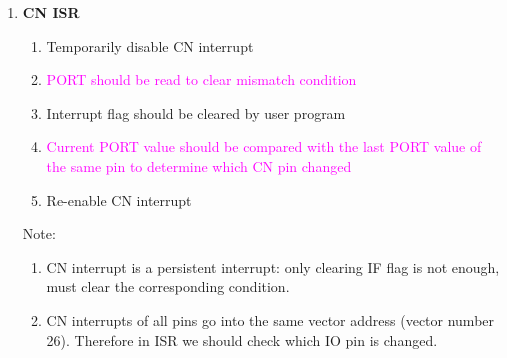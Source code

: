 \documentclass[a4paper]{article}
\begin{document}
\begin{enumerate}[label = \arabic*.]
    \item \textbf{CN ISR}
      \begin{enumerate}[label = \arabic*.]
        \item Temporarily disable CN interrupt
        \item \textcolor{magenta}{PORT should be read to clear mismatch condition}
        \item Interrupt flag should be cleared by user program
        \item \textcolor{magenta}{Current PORT value should be compared with the last PORT value of the same pin to determine which CN pin changed}
        \item Re-enable CN interrupt
      \end{enumerate}

      \par Note:
      \begin{enumerate}[label = \arabic*.]
        \item CN interrupt is a persistent interrupt: only clearing IF flag is not enough, must clear the corresponding condition.
        \item CN interrupts of all pins go into the same vector address (vector number 26). Therefore in ISR we should check which IO pin is changed.
      \end{enumerate}


  \end{enumerate}
\end{document}
